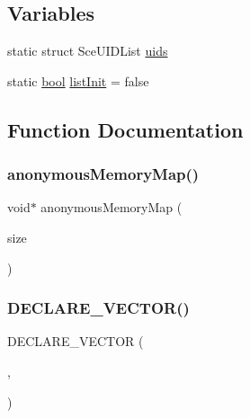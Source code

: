 \subsection*{Variables}
\begin{DoxyCompactItemize}
\item 
static struct Sce\+U\+I\+D\+List \mbox{\hyperlink{psp2-memory_8c_ab770cdb736f8e56264040923e738a123}{uids}}
\item 
static \mbox{\hyperlink{libretro_8h_a4a26dcae73fb7e1528214a068aca317e}{bool}} \mbox{\hyperlink{psp2-memory_8c_a411640a4775605cd71b94607b8352414}{list\+Init}} = false
\end{DoxyCompactItemize}


\subsection{Function Documentation}
\mbox{\label{psp2-memory_8c_a5d8b8a54c5a5972efba2981636430417}} 
\subsubsection{\texorpdfstring{anonymous\+Memory\+Map()}{anonymousMemoryMap()}}
{\footnotesize\ttfamily void$\ast$ anonymous\+Memory\+Map (\begin{DoxyParamCaption}\item[{size\+\_\+t}]{size }\end{DoxyParamCaption})}

\mbox{\label{psp2-memory_8c_afc4985bd27a308f9ffcf1e1ca30c0f6f}} 
\subsubsection{\texorpdfstring{D\+E\+C\+L\+A\+R\+E\+\_\+\+V\+E\+C\+T\+O\+R()}{DECLARE\_VECTOR()}}
{\footnotesize\ttfamily D\+E\+C\+L\+A\+R\+E\+\_\+\+V\+E\+C\+T\+OR (\begin{DoxyParamCaption}\item[{Sce\+U\+I\+D\+List}]{,  }\item[{Sce\+U\+ID}]{ }\end{DoxyParamCaption})}

